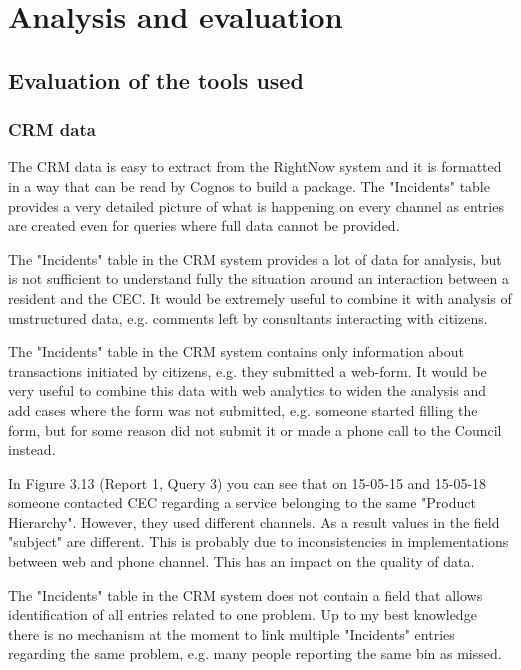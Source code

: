 
\chapter{Analysis and evaluation}
	\section{Evaluation of the tools used}

		\subsection{CRM data}
		
The CRM data is easy to extract from the RightNow system and it is formatted in a way that can be read by Cognos to build a package. The "Incidents" table provides a very detailed picture of what is happening on every channel as entries are created even for queries where full data cannot be provided.

The "Incidents" table in the CRM system provides a lot of data for analysis, but is not sufficient to understand fully the situation around an interaction between a resident and the CEC. It would be extremely useful to combine it with analysis of unstructured data, e.g. comments left by consultants interacting with citizens.

The "Incidents" table in the CRM system contains only information about transactions initiated by citizens, e.g. they submitted a web-form. It would be very useful to combine this data with web analytics to widen the analysis and add cases where the form was not submitted, e.g. someone started filling the form, but for some reason did not submit it or made a phone call to the Council instead.

In Figure 3.13 (Report 1, Query 3) you can see that on 15-05-15 and 15-05-18 someone contacted CEC regarding a service belonging to the same "Product Hierarchy". However, they used different channels. As a result values in the field "subject" are different. This is probably due to inconsistencies in implementations between web and phone channel. This has an impact on the quality of data. 

The "Incidents" table in the CRM system does not contain a field that allows identification of all entries related to one problem. Up to my best knowledge there is no mechanism at the moment to link multiple "Incidents" entries regarding the same problem, e.g. many people reporting the same bin as missed. 

